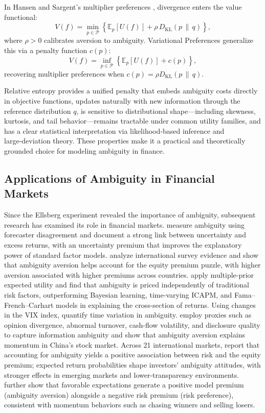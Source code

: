 \documentclass[preprint,12pt,authoryear]{elsarticle}
\begin{document}
In Hansen and Sargent's multiplier preferences \cite{hansen2001}, divergence enters the value functional:
\begin{equation}
V(f)=\min_{p\in\mathcal{P}}\left\{\mathbb{E}_p[U(f)] + \rho\,D_{\mathrm{KL}}(p\,\|\,q)\right\},
\end{equation}
where $\rho>0$ calibrates aversion to ambiguity. Variational Preferences \cite{maccheroni2006} generalize this via a penalty function $c(p)$:
\begin{equation}
V(f)=\inf_{p\in\mathcal{P}}\left\{\mathbb{E}_p[U(f)] + c(p)\right\},
\end{equation}
recovering multiplier preferences when $c(p)=\rho D_{\mathrm{KL}}(p\,\|\,q)$.

Relative entropy provides a unified penalty that embeds ambiguity costs directly in objective functions, updates naturally with new information through the reference distribution $q$, is sensitive to distributional shape—including skewness, kurtosis, and tail behavior—remains tractable under common utility families, and has a clear statistical interpretation via likelihood‑based inference and large‑deviation theory. These properties make it a practical and theoretically grounded choice for modeling ambiguity in finance.


\subsection{Applications of Ambiguity in Financial Markets}

Since the Ellsberg experiment revealed the importance of ambiguity, subsequent research has examined its role in financial markets. \citep{anderson2009} measure ambiguity using forecaster disagreement and document a strong link between uncertainty and excess returns, with an uncertainty premium that improves the explanatory power of standard factor models. \citep{rieger2012} analyze international survey evidence and show that ambiguity aversion helps account for the equity premium puzzle, with higher aversion associated with higher premiums across countries. \citep{ariel2014} apply multiple-prior expected utility and find that ambiguity is priced independently of traditional risk factors, outperforming Bayesian learning, time-varying ICAPM, and Fama–French–Carhart models in explaining the cross-section of returns. Using changes in the VIX index, \citep{williams2015} quantify time variation in ambiguity. \citep{xu2016} employ proxies such as opinion divergence, abnormal turnover, cash-flow volatility, and disclosure quality to capture information ambiguity and show that ambiguity aversion explains momentum in China's stock market. Across 21 international markets, \citep{kim2021} report that accounting for ambiguity yields a positive association between risk and the equity premium; expected return probabilities shape investors' ambiguity attitudes, with stronger effects in emerging markets and lower-transparency environments. \citep{hu2022} further show that favorable expectations generate a positive model premium (ambiguity aversion) alongside a negative risk premium (risk preference), consistent with momentum behaviors such as chasing winners and selling losers.
\end{document}
